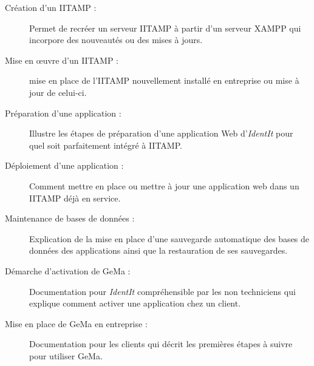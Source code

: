 \begin{description}

  \item[Création d'un IITAMP :] Permet de recréer un serveur IITAMP à
    partir d'un serveur XAMPP qui incorpore des nouveautés ou des mises
    à jours.

  \item[Mise en \oe{}uvre d'un IITAMP :] mise en place de l'IITAMP
    nouvellement installé en entreprise ou mise à jour de celui-ci.

  \item[Préparation d'une application :] Illustre les étapes de
    préparation d'une application Web d'\emph{IdentIt} pour quel soit
    parfaitement intégré à IITAMP.

  \item[Déploiement d'une application :] Comment mettre en place ou
    mettre à jour une application web dans un IITAMP déjà en service.

  \item[Maintenance de bases de données :] Explication de la mise en
    place d'une sauvegarde automatique des bases de données des
    applications ainsi que la restauration de ses sauvegardes.

  \item[Démarche d'activation de GeMa :] Documentation pour
    \emph{IdentIt} compréhensible par les non techniciens qui explique
    comment activer une application chez un client.

  \item[Mise en place de GeMa en entreprise :] Documentation pour les
    clients qui décrit les premières étapes à suivre pour utiliser GeMa.

\end{description}
